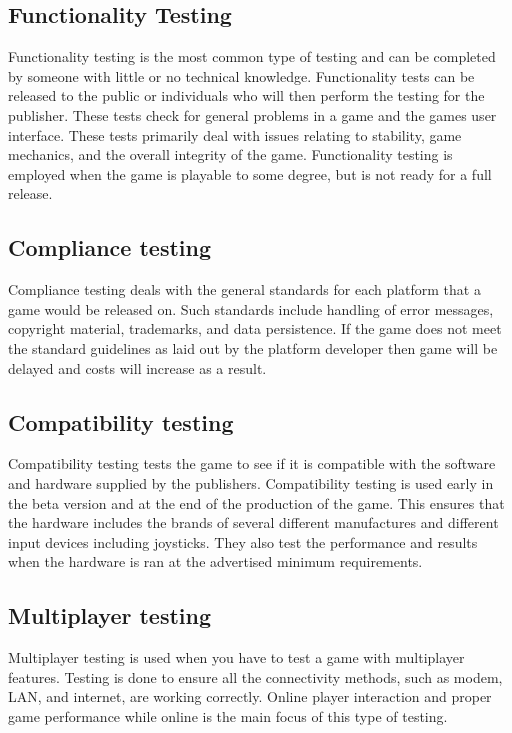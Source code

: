\subsection{Functionality Testing} Functionality testing is the most common type of testing and can be completed by someone with little or no technical knowledge. Functionality tests can be released to the public or individuals who will then perform the testing for the publisher. These tests check for general problems in a game and the games user interface. These tests primarily deal with issues relating to stability, game mechanics, and the overall integrity of the game. Functionality testing is employed when the game is playable to some degree, but is not ready for a full release.

\subsection{Compliance testing} Compliance testing deals with the general standards for each platform that a game would be released on. Such standards include handling of error messages, copyright material, trademarks, and data persistence. If the game does not meet the standard guidelines as laid out by the platform developer then game will be delayed and costs will increase as a result.

\subsection{Compatibility testing} Compatibility testing tests the game to see if it is compatible with the software and hardware supplied by the publishers. Compatibility testing is used early in the beta version and at the end of the production of the game. This ensures that the hardware includes the brands of several different manufactures and different input devices including joysticks. They also test the performance and results when the hardware is ran at the advertised minimum requirements.

\subsection{Multiplayer testing} Multiplayer testing is used when you have to test a game with multiplayer features. Testing is done to ensure all the connectivity methods, such as modem, LAN, and internet, are working correctly. Online player interaction and proper game performance while online is the main focus of this type of testing.

